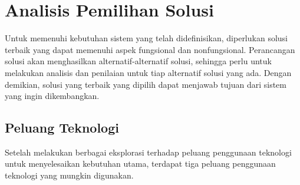 \section{Analisis Pemilihan Solusi}
Untuk memenuhi kebutuhan sistem yang telah didefinisikan, diperlukan solusi terbaik yang dapat memenuhi aspek fungsional dan nonfungsional. Perancangan solusi akan menghasilkan alternatif-alternatif solusi, sehingga perlu untuk melakukan analisis dan penilaian untuk tiap alternatif solusi yang ada. Dengan demikian, solusi yang terbaik yang dipilih dapat menjawab tujuan dari sistem yang ingin dikembangkan.

\subsection{Peluang Teknologi}
Setelah melakukan berbagai eksplorasi terhadap peluang penggunaan teknologi untuk menyelesaikan kebutuhan utama, terdapat tiga peluang penggunaan teknologi yang mungkin digunakan.


